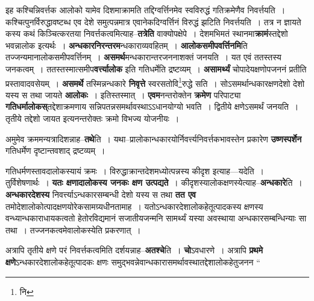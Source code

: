 \documentclass[article,12pt,a4paper]{memoir}
\begin{document}
	  \pstart इह कश्चिन्निवर्त्तक आलोको यामेव दिशमाक्रामति तद्दिग्वर्त्तिनमेव स्वविरुद्धं गतिक्रमेणैव निवर्त्तयति । कश्चित्पुनर्विरुद्धावष्टब्ध एव देशे समुत्पन्नमात्र एवानेकदिग्वर्त्तिनं विरुद्धं झटिति निवर्त्तयति । तत्र न ज्ञायते कस्य कथं किञ्चित्करतया निवर्त्तकत्वमित्याह--\textbf{तत्रेति} वाक्योपक्षेपे । देशमभिमतं स्थानमा\textbf{क्रामं}स्तद्देशो भवन्नालोक इत्यर्थः । \textbf{अन्धकारनिरन्तरम}न्धकाराव्यवहितम् । \textbf{आलोकसमीपवर्त्तिनमि}ति तज्जन्यमानालोकसमीपवर्त्तिनम् । \textbf{असमर्थ}मन्धकारान्तरजननाशक्तं जनयति । यत एवं ततस्तस्य जनकत्वम् । ततस्तस्मात्समीप\textbf{वर्त्त्यालोक} इति गतिधर्मेति द्रष्टव्यम् । \textbf{असामर्थ्यं} चो\leavevmode{}पादेयक्षणोपजननं प्रतीति प्रस्तावादवसेयम् । \textbf{असमर्थे} तस्मिन्नन्धकारे \textbf{निवृत्ते} स्वरसतोवि\footnote{नि}रुद्धे सति । सोऽसमर्थान्धकारक्षणदेशो देशो यस्य स तथा जायते \textbf{आलोकः} । इतिस्तस्मात् । \textbf{एवम}नन्तरोक्तेन \textbf{क्रमेण} परिपाट्या \textbf{गतिधर्मालोकस्}तद्देशाक्रमणाय सन्निपतन्नसमर्थावस्थाऽऽधानयोग्यो भवति । द्वितीये क्षणेऽसमर्थं जनयति । तृतीये तद्देशो जायत इत्यनन्तरोक्तः क्रमो विभज्य योजनीयः ।
	\pend
      

	  \pstart अमुमेव क्रममन्यत्रादिशन्नाह--\textbf{तथे}ति । यथा--प्रालोकान्धकारयोर्निवर्त्त्यनिवर्त्तकभावस्तेन प्रकारेण \textbf{उष्णस्पर्शेन} गतिधर्मेण दृष्टान्तवशाद् द्रष्टव्यम् ।
	\pend
      

	  \pstart गतिधर्मणस्तावदालोकस्यायं क्रमः । विरुद्धाक्रान्तदेशमध्योत्पन्नस्य कीदृश इत्याह—यदेति । तुर्विशेषणार्थः । \textbf{यतः क्षणादालोकस्य जनकः क्षण उत्पद्यते} । कीदृशस्यालोकक्षणस्येत्याह--\textbf{अन्धकारे}ति । \textbf{अन्धकारदेशस्य} निवर्त्त्याऽन्धकारसम्बन्धी देशो यस्य स तथा \textbf{तत एव} तमोदेशालोकोत्पादक्षणयोरेकसामग्र्यधीनतामाह । यतोऽन्धकारदेशालोकहेतूत्पादकस्य क्षणस्य वन्ध्यान्धकाराधायकत्वतो हेतोरविद्यमानं सजातीयजन्मनि सामर्थ्यं यस्या अवस्थाया अन्धकारसम्बन्धिन्याः सा तथा । तज्जनकत्वमेवालोकस्येति प्रकरणात् ।
	\pend
      

	  \pstart अत्रापि तृतीये क्षणे परं निवर्त्तकत्वमिति दर्शयन्नाह--\textbf{अतश्चे}ति । \textbf{चो}ऽवधारणे । अत्रापि \textbf{प्रथमे क्षणे}ऽन्धकारदेशालोकहेतूत्पादकः क्षणः समुद्भवन्नेवान्धकारासमर्थावस्थातद्देशालोकहेतुजनन  \leavevmode{} “
	  
\end{document}
